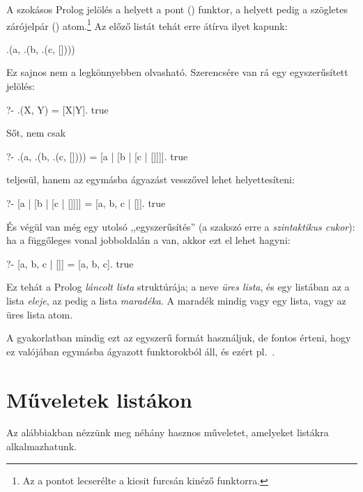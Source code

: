A szokásos Prolog jelölés a  helyett a
pont () funktor, a  helyett pedig a
szögletes zárójelpár (\pr{[]}) atom.\footnote[2]{Az
 a pontot lecserélte a kicsit
furcsán kinéző  funktorra.}
Az előző listát tehát erre átírva ilyet kapunk:
\index{\pr{[]}}
\begin{query}
.(a, .(b, .(c, [])))
\end{query}
Ez sajnos nem a legkönnyebben olvasható. Szerencsére
van rá egy egyszerűsített jelölés:
\begin{query}
?- .(X, Y) = [X|Y].
true
\end{query}
Sőt, nem csak
\begin{query}
?- .(a, .(b, .(c, []))) = [a | [b | [c | []]]].
true
\end{query}
teljesül, hanem az egymásba ágyazást vesszővel lehet
helyettesíteni:
\begin{query}
?- [a | [b | [c | []]]] = [a, b, c | []].
true
\end{query}
És végül van még egy utolsó ,,egyszerűsítés'' (a
szakszó erre a \emph{szintaktikus cukor}): ha a
függőleges vonal jobboldalán a \pr{[]} van, akkor
ezt el lehet hagyni:
\begin{query}
?- [a, b, c | []] = [a, b, c].
true
\end{query}
Ez tehát a Prolog \emph{láncolt lista} struktúrája;
a \pr{[]} neve \emph{üres lista}, és egy \pr{[X|Y]}
listában az  a lista \emph{eleje}, az 
pedig a lista \emph{maradéka}. A maradék mindig vagy
egy lista, vagy az üres lista atom.

A gyakorlatban mindig ezt az egyszerű formát
használjuk, de fontos érteni, hogy ez valójában
egymásba ágyazott funktorokból áll, és ezért
pl.~\pr{[a, b, c] = [a | [b, c]] = [a, b | [c]] =
  [a, b, c | []]}.

\section{Műveletek listákon}

Az alábbiakban nézzünk meg néhány hasznos műveletet,
amelyeket listákra alkalmazhatunk.

